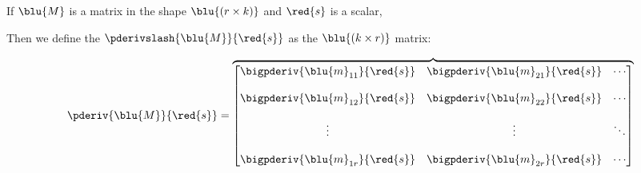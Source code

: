         \begin{definition}
            If $\blu{M}$ is a matrix in the shape $\blu{ (r \times k) }$ and $\red{s}$ is a scalar,
            
            Then we define the  $\pderivslash{ \blu{M} }{ \red{s} }$ as the $\blu{ (k \times r) }$ matrix:
            
            \begin{equation*}
                \pderiv{ \blu{M} }{ \red{s} } 
                =
                \overbrace{
                    \begin{bmatrix}
                        \begin{matrix}
                            \bigpderiv{ \blu{m}_{11} }   { \red{s} }\\ 
                            \\
                            \bigpderiv{ \blu{m}_{12} }   { \red{s} }\\ 
                            \\
                            \vdots \\ 
                            \\
                            \bigpderiv{ \blu{m}_{1r} }   { \red{s} }
                        \end{matrix} 
                        &
                        \begin{matrix}
                            \bigpderiv{ \blu{m}_{21} }   { \red{s} }\\ 
                            \\
                            \bigpderiv{ \blu{m}_{22} }   { \red{s} }\\ 
                            \\
                            \vdots \\ 
                            \\
                            \bigpderiv{ \blu{m}_{2r} }   { \red{s} }
                        \end{matrix}
                        &
                        \begin{matrix}
                            \cdots\\\\ \cdots \\\\ \ddots \\\\ \cdots
                        \end{matrix} 

\end{bmatrix}}
\end{equation*}
\end{definition}
